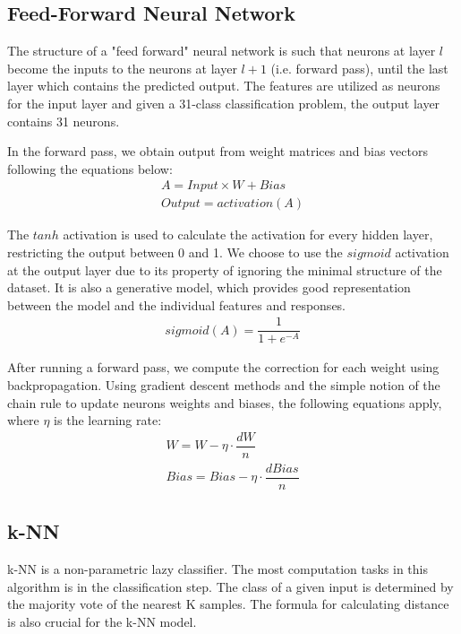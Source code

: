 \documentclass[conference]{IEEEtran}
\begin{document}
\subsection{Feed-Forward Neural Network}
The structure of a "feed forward" neural network is such that neurons at layer $l$ become the inputs to the neurons at layer $l+1$ (i.e. forward pass), until the last layer which contains the predicted output. The features are utilized as neurons for the input layer and given a 31-class classification problem, the output layer contains 31 neurons.

In the forward pass, we obtain output from weight matrices and bias vectors following the equations below:
\begin{align}
A = Input \times W + Bias \\
Output = activation(A) 
\end{align}

The $tanh$ activation is used to calculate the activation for every hidden layer, restricting the output between 0 and 1. We choose to use the $sigmoid$ activation at the output layer due to its property of ignoring the minimal structure of the dataset. It is also a generative model, which provides good
representation between the model and the individual features and responses.
\begin{align}
sigmoid(A) = \dfrac{1}{1+e^{-A}}
\end{align}

After running a forward pass, we compute the correction for each weight using backpropagation. Using gradient descent methods and the simple notion of the chain rule to update neurons weights and biases, the following equations apply, where $\eta$ is the learning rate:
\begin{align}
W = W - \eta \cdot \dfrac{d W}{n} \\
Bias = Bias - \eta \cdot \dfrac{d Bias}{n}
\end{align}

\subsection{k-NN}
k-NN is a non-parametric lazy classifier. The most computation tasks in this algorithm is in the classification step. The class of a given input is determined by the majority vote of the nearest K samples. The formula for calculating distance is also crucial for the k-NN model. 
\end{document}
